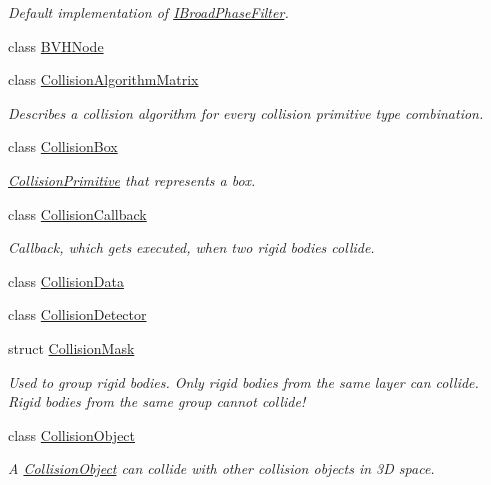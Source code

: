 \begin{DoxyCompactItemize}
\begin{DoxyCompactList}\small\item\em Default implementation of \mbox{\hyperlink{classr3_1_1_i_broad_phase_filter}{I\+Broad\+Phase\+Filter}}. \end{DoxyCompactList}\item 
class \mbox{\hyperlink{classr3_1_1_b_v_h_node}{B\+V\+H\+Node}}
\item 
class \mbox{\hyperlink{classr3_1_1_collision_algorithm_matrix}{Collision\+Algorithm\+Matrix}}
\begin{DoxyCompactList}\small\item\em Describes a collision algorithm for every collision primitive type combination. \end{DoxyCompactList}\item 
class \mbox{\hyperlink{classr3_1_1_collision_box}{Collision\+Box}}
\begin{DoxyCompactList}\small\item\em \mbox{\hyperlink{classr3_1_1_collision_primitive}{Collision\+Primitive}} that represents a box. \end{DoxyCompactList}\item 
class \mbox{\hyperlink{classr3_1_1_collision_callback}{Collision\+Callback}}
\begin{DoxyCompactList}\small\item\em Callback, which gets executed, when two rigid bodies collide. \end{DoxyCompactList}\item 
class \mbox{\hyperlink{classr3_1_1_collision_data}{Collision\+Data}}
\item 
class \mbox{\hyperlink{classr3_1_1_collision_detector}{Collision\+Detector}}
\item 
struct \mbox{\hyperlink{structr3_1_1_collision_mask}{Collision\+Mask}}
\begin{DoxyCompactList}\small\item\em Used to group rigid bodies. Only rigid bodies from the same layer can collide. Rigid bodies from the same group cannot collide! \end{DoxyCompactList}\item 
class \mbox{\hyperlink{classr3_1_1_collision_object}{Collision\+Object}}
\begin{DoxyCompactList}\small\item\em A \mbox{\hyperlink{classr3_1_1_collision_object}{Collision\+Object}} can collide with other collision objects in 3D space. \end{DoxyCompactList}\item 

\end{DoxyCompactItemize}
